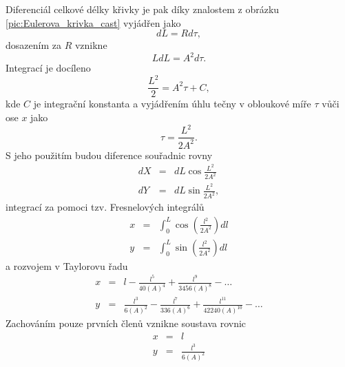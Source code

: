 \documentclass[czech, bc, kky, he, iso690numb]{fasthesis}
\begin{document}
                 Diferenciál celkové délky křivky je pak díky znalostem z obrázku \ref{pic:Eulerova_krivka_cast} vyjádřen jako
                    \begin{equation}
                        d L = R d\tau,
                    \end{equation}
                dosazením za \(R\) vznikne
                    \begin{equation}
                        L d L = A^{2}d\tau.
                    \end{equation}
                Integrací je docíleno
                    \begin{equation}
                        \frac{L^{2}}{2} = A^{2}\tau + C,
                    \end{equation}
                kde \(C\) je integrační konstanta a vyjádřením úhlu tečny v obloukové míře \(\tau\) vůči ose \(x\) jako
                    \begin{equation}
                        \tau = \frac{L^{2}}{2A^{2}}.
                    \end{equation}
                S jeho použitím budou diference souřadnic rovny
                    \begin{eqnarray}
                        d X & = & d L\cos{\frac{L^{2}}{2A^{2}}}\\
                        d Y & = & d L\sin{\frac{L^{2}}{2A^{2}}},
                    \end{eqnarray}
                integrací za pomoci tzv. Fresnelových integrálů
                    \begin{eqnarray}
                        x & = & \int_{0}^{L}\cos(\frac{l^{2}}{2A^{2}})dl\\
                        y & = &\int_{0}^{L}\sin(\frac{l^{2}}{2A^{2}})dl
                    \end{eqnarray}
                a rozvojem v Taylorovu řadu
                    \begin{eqnarray}
                        x & = & l -\frac{l^{5}}{40(A)^{4}}+\frac{l^{9}}{3456(A)^{8}}-\dots\\
                        y & = & \frac{l^{3}}{6(A)^{2}}-\frac{l^{7}}{336(A)^{6}}+\frac{l^{11}}{42240(A)^{10}}-\dots
                    \end{eqnarray}
                Zachováním pouze prvních členů vznikne soustava rovnic
                    \begin{eqnarray}
                        x & = & l \\
                        y & = & \frac{l^{3}}{6(A)^{2}}
                    \end{eqnarray}
\end{document}
